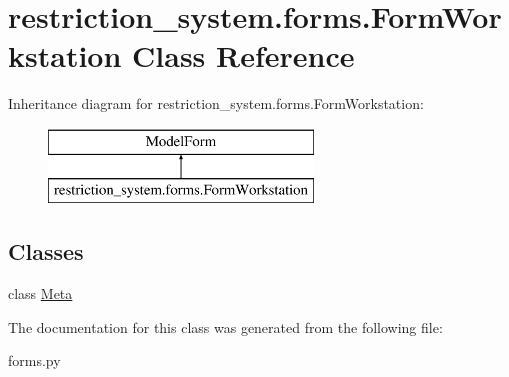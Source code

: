 \hypertarget{classrestriction__system_1_1forms_1_1FormWorkstation}{}\section{restriction\+\_\+system.\+forms.\+Form\+Workstation Class Reference}
\label{classrestriction__system_1_1forms_1_1FormWorkstation}
Inheritance diagram for restriction\+\_\+system.\+forms.\+Form\+Workstation\+:\begin{figure}[H]
\begin{center}
\leavevmode
\includegraphics[height=2.000000cm]{classrestriction__system_1_1forms_1_1FormWorkstation}
\end{center}
\end{figure}
\subsection*{Classes}
\begin{DoxyCompactItemize}
\item 
class \hyperlink{classrestriction__system_1_1forms_1_1FormWorkstation_1_1Meta}{Meta}
\end{DoxyCompactItemize}


The documentation for this class was generated from the following file\+:\begin{DoxyCompactItemize}
\item 
forms.\+py\end{DoxyCompactItemize}
